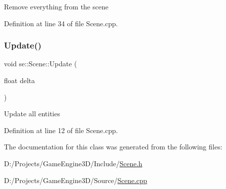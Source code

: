 Remove everything from the scene 

Definition at line 34 of file Scene.\+cpp.

\mbox{\label{classse_1_1_scene_acdc3858f5d4fd76cf9a712a02218341a}} 
\subsubsection{\texorpdfstring{Update()}{Update()}}
{\footnotesize\ttfamily void se\+::\+Scene\+::\+Update (\begin{DoxyParamCaption}\item[{float}]{delta }\end{DoxyParamCaption})}

Update all entities 

Definition at line 12 of file Scene.\+cpp.



The documentation for this class was generated from the following files\+:\begin{DoxyCompactItemize}
\item 
D\+:/\+Projects/\+Game\+Engine3\+D/\+Include/\mbox{\hyperlink{_scene_8h}{Scene.\+h}}\item 
D\+:/\+Projects/\+Game\+Engine3\+D/\+Source/\mbox{\hyperlink{_scene_8cpp}{Scene.\+cpp}}\end{DoxyCompactItemize}
